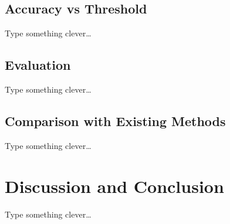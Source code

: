 \documentclass[runningheads,a4paper]{llncs}
\begin{document}
\subsection{Accuracy vs Threshold}
Type something clever\dots

\subsection{Evaluation}
Type something clever\dots

\subsection{Comparison with Existing Methods}
Type something clever\dots

\section{Discussion and Conclusion}
Type something clever\dots



\end{document}
